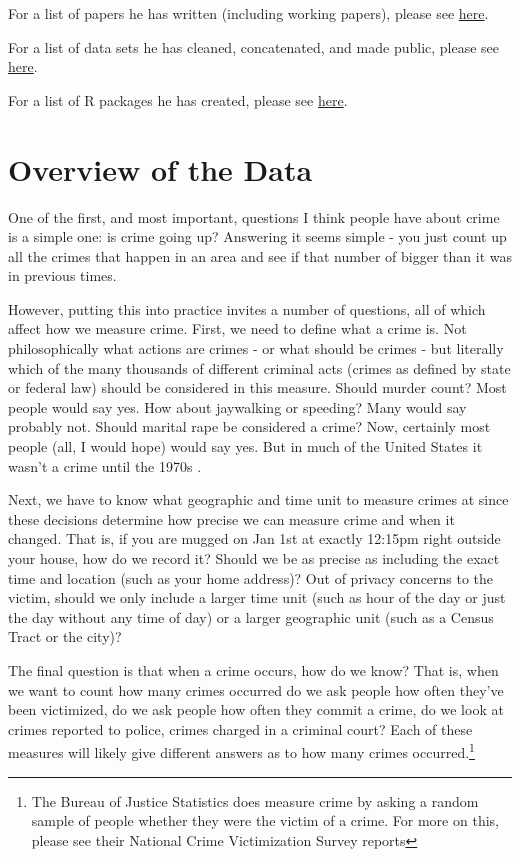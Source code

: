 \documentclass[
  12pt,
  openany]{book}
\begin{document}
For a list of papers he has written (including working papers), please see \href{http://jacobdkaplan.com/research.html}{here}.

For a list of data sets he has cleaned, concatenated, and made public, please see \href{http://jacobdkaplan.com/data.html}{here}.

For a list of R packages he has created, please see \href{https://jacobdkaplan.com/packages.html}{here}.

\hypertarget{ucrGeneral}{%
\chapter{Overview of the Data}\label{ucrGeneral}}

One of the first, and most important, questions I think people have about crime is a simple one: is crime going up? Answering it seems simple - you just count up all the crimes that happen in an area and see if that number of bigger than it was in previous times.

However, putting this into practice invites a number of questions, all of which affect how we measure crime. First, we need to define what a crime is. Not philosophically what actions are crimes - or what should be crimes - but literally which of the many thousands of different criminal acts (crimes as defined by state or federal law) should be considered in this measure. Should murder count? Most people would say yes. How about jaywalking or speeding? Many would say probably not. Should marital rape be considered a crime? Now, certainly most people (all, I would hope) would say yes. But in much of the United States it wasn't a crime until the 1970s \citep{bennice2003marital, mcmahon2009criminalizing}.

Next, we have to know what geographic and time unit to measure crimes at since these decisions determine how precise we can measure crime and when it changed. That is, if you are mugged on Jan 1st at exactly 12:15pm right outside your house, how do we record it? Should we be as precise as including the exact time and location (such as your home address)? Out of privacy concerns to the victim, should we only include a larger time unit (such as hour of the day or just the day without any time of day) or a larger geographic unit (such as a Census Tract or the city)?

The final question is that when a crime occurs, how do we know? That is, when we want to count how many crimes occurred do we ask people how often they've been victimized, do we ask people how often they commit a crime, do we look at crimes reported to police, crimes charged in a criminal court? Each of these measures will likely give different answers as to how many crimes occurred.\footnote{The Bureau of Justice Statistics does measure crime by asking a random sample of people whether they were the victim of a crime. For more on this, please see their National Crime Victimization Survey reports}
\end{document}
